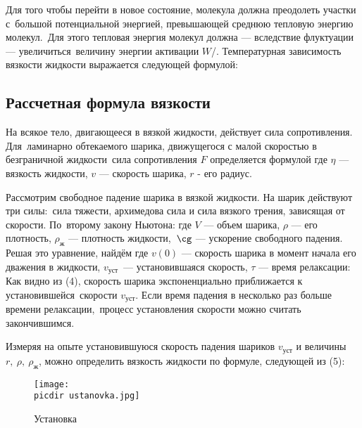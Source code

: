 \documentclass[a4paper, 12pt]{article}
\def \picdir{pic/}
\begin{document}
Для того чтобы перейти в новое состояние, молекула должна преодолеть участки с\
большой  потенциальной энергией, превышающей среднюю тепловую энергию молекул.\
Для этого тепловая энергия молекул должна --- вследствие флуктуации --- увеличиться\
величину энергии активации $W$/. Температурная зависимость вязкости жидкости
выражается следующей формулой:
\salign{\eta \sim Ae^{\frac{W}{kT}}.}

\subsection{Рассчетная формула вязкости}
На всякое тело, двигающееся в вязкой жидкости, действует сила сопротивления. Для\
ламинарно обтекаемого шарика, движущегося с малой скоростью в безграничной жидкости\
сила сопротивления $F$ определяется формулой
где $\eta$ --- вязкость жидкости, $v$ --- скорость шарика, $r$ - его радиус.

Рассмотрим свободное падение шарика в вязкой жидкости. На шарик действуют три силы:\
сила тяжести, архимедова сила и сила вязкого трения, зависящая от скорости. По\
второму закону Ньютона:
где $V$ --- объем шарика, $\rho$ --- его плотность, $\rho_{\text{ж}}$ --- плотность жидкости,\
$\cg$ --- ускорение свободного падения. Решая это уравнение, найдём
где $v(0)$ --- скорость шарика в момент начала его дважения в жидкости, $v_{\text{уст}}$\
--- установившаяся скорость, $\tau$ --- время релаксации:
Как видно из (4), скорость шарика экспоненциально приближается к установившейся\
скорости $v_{\text{уст}}$. Если время падения в несколько раз больше времени релаксации,\
процесс установления скорости можно считать закончившимся.

Измеряя на опыте установившуюся скорость падения шариков $v_{\text{уст}}$ и величины\
$r,\ \rho,\ \rho_{\text{ж}}$, можно определить вязкость жидкости по формуле, следующей из (5):
\salign{\eta = \frac{2}{36} \cg d^2 \frac{\rho - \rho_{\text{ж}}}{v_{\text{уст}}}.}

\begin{figure}[h]
  \begin{center}
    \texttt{[image: \\picdir ustanovka.jpg]}
    \caption{Установка}
  \end{center}
\end{figure}
\end{document}
